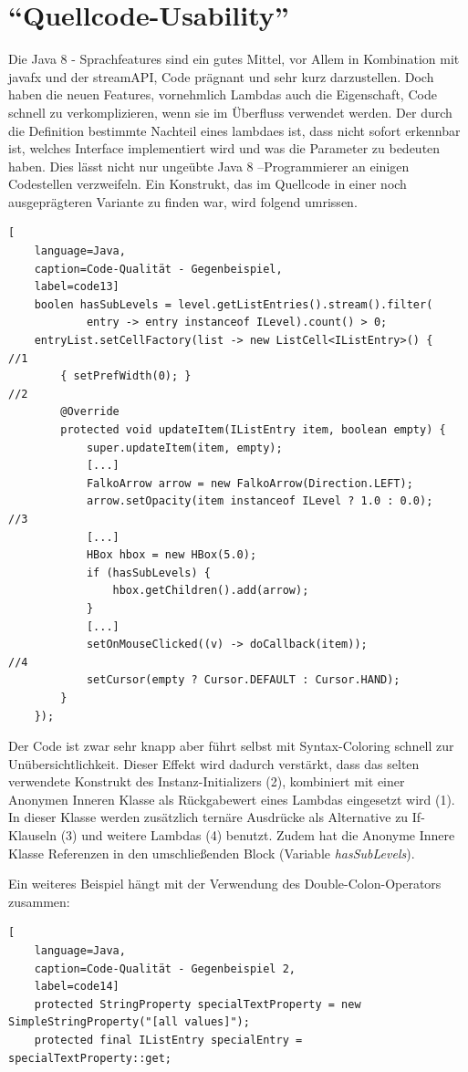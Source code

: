 \section{\enquote{Quellcode-Usability}} \label{sec:quellcodeUsability}
Die Java 8 - Sprachfeatures sind ein gutes Mittel, vor Allem in Kombination mit \gls{javafx} und der \gls{streamAPI}, Code prägnant und sehr kurz darzustellen. Doch haben die neuen Features, vornehmlich Lambdas auch die Eigenschaft, Code schnell zu verkomplizieren, wenn sie im Überfluss verwendet werden. Der durch die Definition bestimmte Nachteil eines \gls{lambda}es ist, dass nicht sofort erkennbar ist, welches Interface implementiert wird und was die Parameter zu bedeuten haben. Dies lässt nicht nur ungeübte Java 8 –Programmierer an einigen Codestellen verzweifeln. Ein Konstrukt, das im Quellcode in einer noch ausgeprägteren Variante zu finden war, wird folgend umrissen.

\begin{lstlisting}[
    language=Java,
    caption=Code-Qualität - Gegenbeispiel,
    label=code13]
	boolen hasSubLevels = level.getListEntries().stream().filter(
			entry -> entry instanceof ILevel).count() > 0;
	entryList.setCellFactory(list -> new ListCell<IListEntry>() { 		//1
		{ setPrefWidth(0); } 																//2
		@Override
		protected void updateItem(IListEntry item, boolean empty) {
			super.updateItem(item, empty);
			[...]
			FalkoArrow arrow = new FalkoArrow(Direction.LEFT);
			arrow.setOpacity(item instanceof ILevel ? 1.0 : 0.0); 			//3
			[...]
			HBox hbox = new HBox(5.0);
			if (hasSubLevels) {
				hbox.getChildren().add(arrow);
			}
			[...]
			setOnMouseClicked((v) -> doCallback(item)); 						//4
			setCursor(empty ? Cursor.DEFAULT : Cursor.HAND);
		}
	});
\end{lstlisting}

Der Code ist zwar sehr knapp aber führt selbst mit Syntax-Coloring schnell zur Unübersichtlichkeit. Dieser Effekt wird dadurch verstärkt, dass das selten verwendete Konstrukt des Instanz-Initializers (2), kombiniert mit einer Anonymen Inneren Klasse als Rückgabewert eines Lambdas eingesetzt wird (1). In dieser Klasse werden zusätzlich ternäre Ausdrücke als Alternative zu If-Klauseln (3) und weitere Lambdas (4) benutzt. Zudem hat die Anonyme Innere Klasse Referenzen in den umschließenden Block (Variable \textit{hasSubLevels}).

Ein weiteres Beispiel hängt mit der Verwendung des Double-Colon-Operators zusammen:

\begin{lstlisting}[
    language=Java,
    caption=Code-Qualität - Gegenbeispiel 2,
    label=code14]
	protected StringProperty specialTextProperty = new SimpleStringProperty("[all values]");
	protected final IListEntry specialEntry = specialTextProperty::get;
\end{lstlisting}

